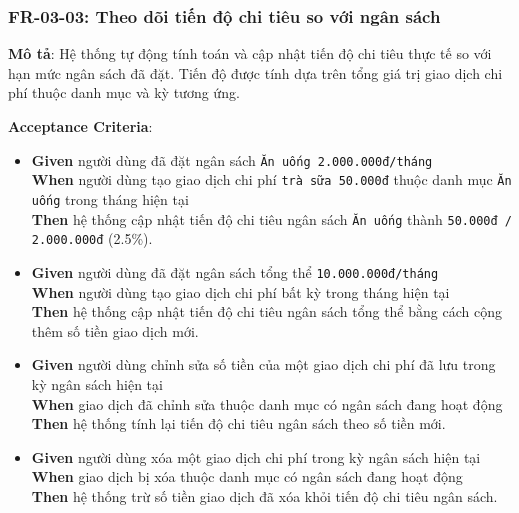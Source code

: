 \subsubsection{FR-03-03: Theo dõi tiến độ chi tiêu so với ngân sách}

\textbf{Mô tả}: Hệ thống tự động tính toán và cập nhật tiến độ chi tiêu thực tế so với hạn mức ngân sách đã đặt. Tiến độ được tính dựa trên tổng giá trị giao dịch chi phí thuộc danh mục và kỳ tương ứng.



\textbf{Acceptance Criteria}:

\begin{itemize}
\item \textbf{Given} người dùng đã đặt ngân sách \texttt{Ăn uống 2.000.000đ/tháng}  \\ \hspace*{1.5em}  \textbf{When} người dùng tạo giao dịch chi phí \texttt{trà sữa 50.000đ} thuộc danh mục \texttt{Ăn uống} trong tháng hiện tại  \\ \hspace*{1.5em}  \textbf{Then} hệ thống cập nhật tiến độ chi tiêu ngân sách \texttt{Ăn uống} thành \texttt{50.000đ / 2.000.000đ} (2.5\%).
\item \textbf{Given} người dùng đã đặt ngân sách tổng thể \texttt{10.000.000đ/tháng}  \\ \hspace*{1.5em}  \textbf{When} người dùng tạo giao dịch chi phí bất kỳ trong tháng hiện tại  \\ \hspace*{1.5em}  \textbf{Then} hệ thống cập nhật tiến độ chi tiêu ngân sách tổng thể bằng cách cộng thêm số tiền giao dịch mới.
\item \textbf{Given} người dùng chỉnh sửa số tiền của một giao dịch chi phí đã lưu trong kỳ ngân sách hiện tại  \\ \hspace*{1.5em}  \textbf{When} giao dịch đã chỉnh sửa thuộc danh mục có ngân sách đang hoạt động  \\ \hspace*{1.5em}  \textbf{Then} hệ thống tính lại tiến độ chi tiêu ngân sách theo số tiền mới.
\item \textbf{Given} người dùng xóa một giao dịch chi phí trong kỳ ngân sách hiện tại  \\ \hspace*{1.5em}  \textbf{When} giao dịch bị xóa thuộc danh mục có ngân sách đang hoạt động  \\ \hspace*{1.5em}  \textbf{Then} hệ thống trừ số tiền giao dịch đã xóa khỏi tiến độ chi tiêu ngân sách.

\end{itemize}
